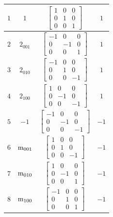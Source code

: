 \documentclass[fleqn,8pt]{jsarticle}
\begin{document}
\begin{longtable}{cccc}
$ 1 $ & $ 1 $ & $ \begin{bmatrix} 1 & 0 & 0 \\ 0 & 1 & 0 \\ 0 & 0 & 1 \end{bmatrix} $ & $ 1 $ \\ \hline
$ 2 $ & $ 2{}_{001} $ & $ \begin{bmatrix} -1 & 0 & 0 \\ 0 & -1 & 0 \\ 0 & 0 & 1 \end{bmatrix} $ & $ 1 $ \\ \hline
$ 3 $ & $ 2{}_{010} $ & $ \begin{bmatrix} -1 & 0 & 0 \\ 0 & 1 & 0 \\ 0 & 0 & -1 \end{bmatrix} $ & $ 1 $ \\ \hline
$ 4 $ & $ 2{}_{100} $ & $ \begin{bmatrix} 1 & 0 & 0 \\ 0 & -1 & 0 \\ 0 & 0 & -1 \end{bmatrix} $ & $ 1 $ \\ \hline
$ 5 $ & $ -1 $ & $ \begin{bmatrix} -1 & 0 & 0 \\ 0 & -1 & 0 \\ 0 & 0 & -1 \end{bmatrix} $ & $ -1 $ \\ \hline
$ 6 $ & $ {\rm m}_{001} $ & $ \begin{bmatrix} 1 & 0 & 0 \\ 0 & 1 & 0 \\ 0 & 0 & -1 \end{bmatrix} $ & $ -1 $ \\ \hline
$ 7 $ & $ {\rm m}_{010} $ & $ \begin{bmatrix} 1 & 0 & 0 \\ 0 & -1 & 0 \\ 0 & 0 & 1 \end{bmatrix} $ & $ -1 $ \\ \hline
$ 8 $ & $ {\rm m}_{100} $ & $ \begin{bmatrix} -1 & 0 & 0 \\ 0 & 1 & 0 \\ 0 & 0 & 1 \end{bmatrix} $ & $ -1 $ \\
\end{longtable}
\end{document}
